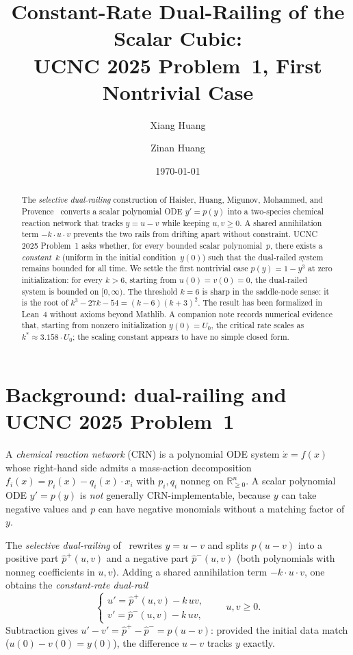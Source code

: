 \documentclass[11pt]{article}
\title{Constant-Rate Dual-Railing of the Scalar Cubic:\\
       UCNC 2025 Problem~1, First Nontrivial Case}
\author{Xiang Huang \and Zinan Huang}
\date{\today}
\newcommand{\R}{\mathbb{R}}
\begin{document}
\maketitle

\begin{abstract}
The \emph{selective dual-railing} construction of Haisler, Huang, Migunov, Mohammed, and Provence~\cite{UCNC25}
converts a scalar polynomial ODE $y' = p(y)$ into a two-species chemical reaction
network that tracks $y = u - v$ while keeping $u, v \ge 0$.  A shared
annihilation term $-k \cdot u \cdot v$ prevents the two rails from drifting
apart without constraint.  UCNC 2025 Problem~1 asks whether, for every bounded
scalar polynomial~$p$, there exists a \emph{constant}~$k$ (uniform in the
initial condition~$y(0)$) such that the dual-railed system remains bounded for
all time.  We settle the first nontrivial case $p(y) = 1 - y^{3}$ at zero
initialization: for every $k > 6$, starting from $u(0) = v(0) = 0$, the
dual-railed system is bounded on $[0, \infty)$.  The threshold $k = 6$ is sharp
in the saddle-node sense: it is the root of
$k^{3} - 27k - 54 = (k-6)(k+3)^{2}$.  The result has been formalized in Lean~4
without axioms beyond Mathlib.  A companion note records numerical evidence
that, starting from nonzero initialization $y(0) = U_{0}$, the critical rate
scales as $k^{*} \approx 3.158 \cdot U_{0}$; the scaling constant appears to
have no simple closed form.
\end{abstract}

\section{Background: dual-railing and UCNC 2025 Problem~1}

A \emph{chemical reaction network} (CRN) is a polynomial ODE system
$\dot{x} = f(x)$ whose right-hand side admits a mass-action decomposition
$f_{i}(x) = p_{i}(x) - q_{i}(x) \cdot x_{i}$ with $p_{i}, q_{i}$ nonneg on
$\R_{\ge 0}^{n}$.  A scalar polynomial ODE $y' = p(y)$ is \emph{not} generally
CRN-implementable, because $y$ can take negative values and $p$ can have
negative monomials without a matching factor of~$y$.

The \emph{selective dual-railing} of~\cite{UCNC25} rewrites $y = u - v$ and
splits $p(u-v)$ into a positive part $\hat{p}^{+}(u,v)$ and a negative part
$\hat{p}^{-}(u,v)$ (both polynomials with nonneg coefficients in $u, v$).
Adding a shared annihilation term $-k \cdot u \cdot v$, one obtains the
\emph{constant-rate dual-rail}
\begin{equation}\label{eq:dualrail-general}
  \begin{cases}
    u' = \hat{p}^{+}(u,v) - k\, u v, \\[3pt]
    v' = \hat{p}^{-}(u,v) - k\, u v,
  \end{cases}
  \qquad u, v \ge 0.
\end{equation}
Subtraction gives $u' - v' = \hat{p}^{+} - \hat{p}^{-} = p(u-v)$: provided the
initial data match ($u(0) - v(0) = y(0)$), the difference $u - v$ tracks $y$
exactly.
\end{document}
